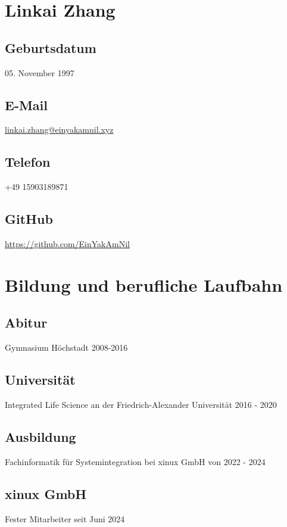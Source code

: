 \documentclass{article}
\begin{document}
\author{Linkai Zhang}

\section{Linkai Zhang}

\subsection{Geburtsdatum}
05. November 1997

\subsection{E-Mail}
\href{mailto:linkai.zhang@einyamkamnil.xyz}{linkai.zhang@einyakamnil.xyz}

\subsection{Telefon}
+49 15903189871

\subsection{GitHub}
\href{https://github.com/EinYakAmNil}{https://github.com/EinYakAmNil}

\section{Bildung und berufliche Laufbahn}

\subsection{Abitur}
Gymnasium Höchstadt 2008-2016

\subsection{Universität}
Integrated Life Science an der Friedrich-Alexander Universität 2016 - 2020

\subsection{Ausbildung}
Fachinformatik für Systemintegration bei xinux GmbH von 2022 - 2024

\subsection{xinux GmbH}
Fester Mitarbeiter seit Juni 2024
\end{document}
